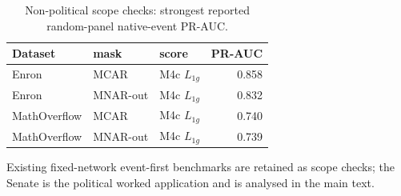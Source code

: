 \begin{table}[tbp]
\centering
\caption{Non-political scope checks: strongest reported random-panel native-event PR-AUC.}
\label{tab:scope-checks}
\begin{tabular}{lllr}
\toprule
Dataset & mask & score & PR-AUC \\
\midrule
Enron & MCAR & M4c $L_{1g}$ & 0.858 \\
Enron & MNAR-out & M4c $L_{1g}$ & 0.832 \\
MathOverflow & MCAR & M4c $L_{1g}$ & 0.740 \\
MathOverflow & MNAR-out & M4c $L_{1g}$ & 0.739 \\
\bottomrule
\end{tabular}
\par\vspace{2pt}\footnotesize Existing fixed-network event-first benchmarks are retained as scope checks; the Senate is the political worked application and is analysed in the main text.
\end{table}
